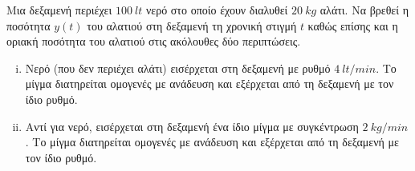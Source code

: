 \begin{myboxs1}
\begin{problem}
  Μια δεξαμενή περιέχει $ \SI{100}{lt} $ νερό στο οποίο έχουν διαλυθεί 
  $ \SI{20}{kg} $ αλάτι. Να βρεθεί η ποσότητα $ y(t) $ του αλατιού στη δεξαμενή 
  τη χρονική στιγμή $t$ καθώς επίσης και η οριακή ποσότητα του αλατιού στις ακόλουθες 
  δύο περιπτώσεις.
  \begin{enumerate}[i)]
    \item Νερό (που δεν περιέχει αλάτι) εισέρχεται στη δεξαμενή με ρυθμό 
      $ \SI{4}{lt/min} $. Το μίγμα διατηρείται ομογενές με ανάδευση και εξέρχεται από τη
      δεξαμενή με τον ίδιο ρυθμό.
    \item Αντί για νερό, εισέρχεται στη δεξαμενή ένα ίδιο μίγμα με συγκέντρωση 
      $ \SI{2}{kg/min} $. Το μίγμα διατηρείται ομογενές με ανάδευση και εξέρχεται από τη
      δεξαμενή με τον ίδιο ρυθμό.   
  \end{enumerate}
\end{problem}
\end{myboxs1}
